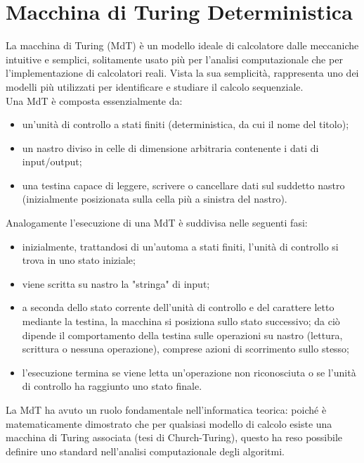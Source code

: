 \section{Macchina di Turing Deterministica}
La macchina di Turing (MdT) è un modello ideale di calcolatore dalle meccaniche intuitive e semplici, solitamente usato più per l'analisi computazionale che per l'implementazione di calcolatori reali. Vista la sua semplicità, rappresenta uno dei modelli più utilizzati per identificare e studiare il calcolo sequenziale.\\
Una MdT è composta essenzialmente da:
\begin{itemize}
\item{un'unità di controllo a stati finiti (deterministica, da cui il nome del titolo);}
\item{un nastro diviso in celle di dimensione arbitraria contenente i dati di input/output;}
\item{una testina capace di leggere, scrivere o cancellare dati sul suddetto nastro (inizialmente posizionata sulla cella più a sinistra del nastro).}
\end{itemize}
Analogamente l'esecuzione di una MdT è suddivisa nelle seguenti fasi:
\begin{itemize}
\item{inizialmente, trattandosi di un'automa a stati finiti, l'unità di controllo si trova in uno stato iniziale;}
\item{viene scritta su nastro la "stringa" di input;}
\item{a seconda dello stato corrente dell'unità di controllo e del carattere letto mediante la testina, la macchina si posiziona sullo stato successivo; da ciò dipende il comportamento della testina sulle operazioni su nastro (lettura, scrittura o nessuna operazione), comprese azioni di scorrimento sullo stesso;}
\item{l'esecuzione termina se viene letta un'operazione non riconosciuta o se l'unità di controllo ha raggiunto uno stato finale.}
\end{itemize}
La MdT ha avuto un ruolo fondamentale nell'informatica teorica: poiché è matematicamente dimostrato che per qualsiasi modello di calcolo esiste una macchina di Turing associata (tesi di Church-Turing), questo ha reso possibile definire uno standard nell'analisi computazionale degli algoritmi.
